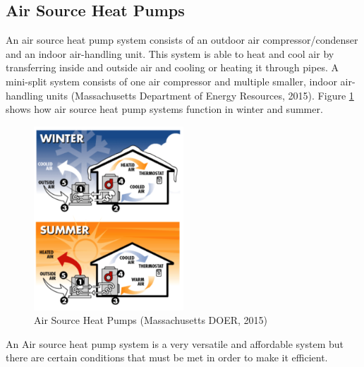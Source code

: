     \subsection{Air Source Heat Pumps}
    \par An air source heat pump system consists of an outdoor air compressor/condenser and an indoor air-handling unit. This system is able to heat and cool air by transferring inside and outside air and cooling or heating it through pipes. A mini-split system consists of one air compressor and multiple smaller, indoor air-handling units (Massachusetts Department of Energy Resources, 2015). Figure \ref{fig:ashp} shows how air source heat pump systems function in winter and summer.
    \begin{figure}[h]
      \centering
        \includegraphics[width=0.5\textwidth]{images/06-AirSourceHeatPump}
      \caption{Air Source Heat Pumps (Massachusetts DOER, 2015)}
      \label{fig:ashp}
    \end{figure}
    \par An Air source heat pump system is a very versatile and affordable system but there are certain conditions that must be met in order to make it efficient.\\
    
